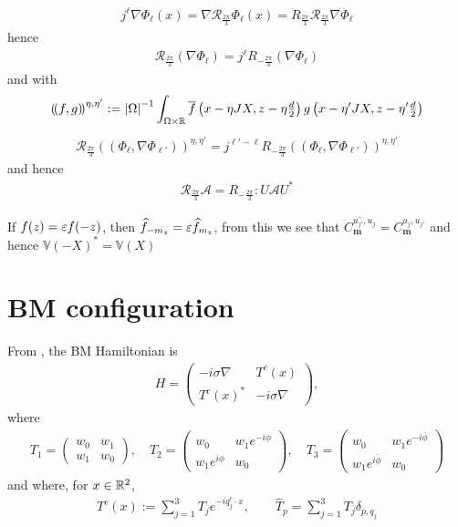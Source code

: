 \documentclass[11pt,a4paper,reqno,french,tikz]{amsart}
\newcommand\cA{\mathcal{A}}\newcommand\cB{\mathcal{B}}\newcommand\cC{\mathcal{C}}\newcommand\cD{\mathcal{D}}\newcommand\cE{\mathcal{E}}\newcommand\cF{\mathcal{F}}\newcommand\cG{\mathcal{G}}\newcommand\cH{\mathcal{H}}\newcommand\cI{\mathcal{I}}\newcommand\cJ{\mathcal{J}}\newcommand\cK{\mathcal{K}}\newcommand\cL{\mathcal{L}}\newcommand\cM{\mathcal{M}}\newcommand\cN{\mathcal{N}}\newcommand\cO{\mathcal{O}}\newcommand\cP{\mathcal{P}}\newcommand\cQ{\mathcal{Q}}\newcommand\cR{\mathcal{R}}\newcommand\cS{\mathcal{S}}\newcommand\cT{\mathcal{T}}\newcommand\cU{\mathcal{U}}\newcommand\cV{\mathcal{V}}\newcommand\cW{\mathcal{W}}\newcommand\cX{\mathcal{X}}\newcommand\cY{\mathcal{Y}}\newcommand\cZ{\mathcal{Z}}
\newcommand{\pa}[1]{\left( #1 \right)} %
\newcommand{\ab}[1]{\left|#1\right|} %
\newcommand{\na}{\nabla} %
\newcommand{\f}[2]{\frac{#1}{#2}} %
\newcommand{\mat}[1]{\begin{pmatrix} #1 \end{pmatrix}} %
\newcommand{\bbV}{\mathbb{V}}
\newcommand{\db}[1]{\left(\!\left( #1 \right)\!\right)}
\def\bmm{{\mathbf m}}
\def\bbV{{\mathbb V}}
\newcommand{\dd}{\tfrac{d}{2}}
\begin{document}
\begin{align*}
j^{\ell} \na \Phi_\ell(x) = \na \cR_{\f{2\pi}3} \Phi_\ell(x) = R_{\f{2\pi}3} \cR_{\f{2\pi}3} \na \Phi_\ell
\end{align*}
hence
\begin{align*}
\cR_{\f{2\pi}3} \pa{\na \Phi_\ell} = j^\ell R_{-\f{2\pi}3} \pa{\na \Phi_\ell}
\end{align*}
and with
\begin{align*}
\db{f,g}^{\eta,\eta'} := \ab{\Omega}^{-1} \int_{\Omega\times\R} \overline{f}\pa{x-\eta JX,z - \eta \dd} g\pa{x-\eta'JX,z-\eta'\dd}
\end{align*}
\begin{align*}
\cR_{\f{2\pi}3} \db{ \Phi_\ell,\na \Phi_{\ell'} }^{\eta,\eta'} = j^{\ell'-\ell}R_{-\f{2\pi}3} \db{  \Phi_\ell,\na \Phi_{\ell'}}^{\eta,\eta'}
\end{align*}
and hence
\begin{align*}
\cR_{\f{2\pi}3} \bm{\cA} = R_{-\f{2\pi}3} : U \bm{\cA} U^*
\end{align*}

If $f(z) = \varepsilon f(-z)$, then $\widehat{f}_{-m_z} = \varepsilon \widehat{f}_{m_z}$, from this we see that $\overline{C_\bmm^{u_{j'},u_{j}}} = C_\bmm^{u_{j},u_{j'}}$ and hence $\bbV(-X)^* = \bbV(X)$







\section{BM configuration}%
\label{sec:bm_configuration}


From \cite{BecEmbWitZwo21}, the BM Hamiltonian is
\begin{align*}
	H = \mat{-i\sigma \na & T^c(x) \\ T^c(x)^* & -i \sigma \na},
\end{align*}
where
\begin{align*}
\boxed{T_1 = \mat{w_0 & w_1 \\ w_1 & w_0}, \quad  T_2 = \mat{w_0 &  w_1e^{-i\phi} \\  w_1e^{i\phi} & w_0}, \quad T_3 = \mat{w_0 &  w_1e^{-i\overline{\phi}} \\  w_1e^{i\overline{\phi}} & w_0}}
\end{align*}
and where, for $x \in \mathbb{R}^2$,
\begin{align*}
T^c(x) := \sum_{j=1}^3 T_j e^{-iq^c_j \cdot x}, \qquad \widehat{T}_p = \sum_{j=1}^{3} T_j \delta_{p,q_j}
\end{align*}
\end{document}
